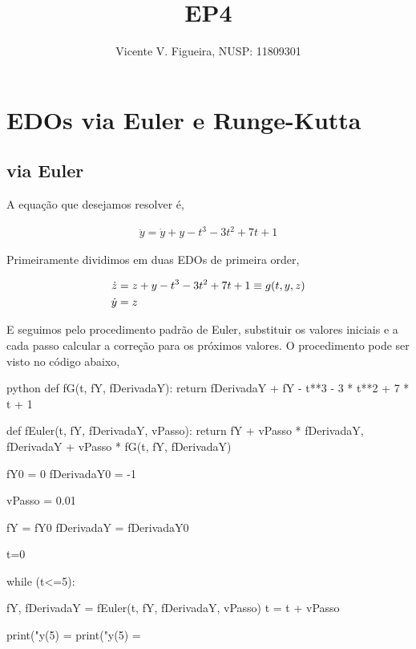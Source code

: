 \documentclass[twoside]{amsart}
\title
{
    \Huge EP4
}
\author
{
    \large Vicente V. Figueira, NUSP: 11809301
}
\numberwithin{equation}{section}
\begin{document}
\maketitle





\section{\Large EDOs via Euler e Runge-Kutta}

\subsection{via Euler}

A equação que desejamos resolver é,

\begin{align}
    \ddot y=\dot y+y-t^3-3t^2+7t+1\nonumber
\end{align}

Primeiramente dividimos em duas EDOs de primeira order,

\begin{align}
    \dot z&=z+y-t^3-3t^2+7t+1\equiv g\qty(t,y,z)\nonumber\\
    \dot y&=z\nonumber
\end{align}

E seguimos pelo procedimento padrão de Euler, substituir os valores iniciais e a cada passo 
calcular a correção para os próximos valores. O procedimento pode ser visto no código abaixo,

\begin{mintedbox}{python}
def fG(t, fY, fDerivadaY):
    return fDerivadaY + fY - t**3 - 3 * t**2 + 7 * t + 1

def fEuler(t, fY, fDerivadaY, vPasso):
    return fY + vPasso * fDerivadaY, fDerivadaY + vPasso * fG(t, fY, fDerivadaY)

fY0 = 0
fDerivadaY0 = -1

vPasso = 0.01

fY = fY0
fDerivadaY = fDerivadaY0

t=0

while (t<=5):

    fY, fDerivadaY = fEuler(t, fY, fDerivadaY, vPasso)
    t = t + vPasso    

print("y(5) = %
print("y(5) = %
\end{mintedbox}
\end{document}
